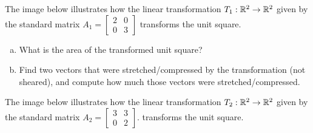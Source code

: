 
\begin{applicationActivities}{1}{25}

\begin{activity}{5}
The image below illustrates how the linear transformation
$T_1 : \mathbb{R}^2 \rightarrow \mathbb{R}^2$ given by the
standard matrix $A_1 = \begin{bmatrix} 2 & 0 \\ 0 & 3 \end{bmatrix}$
transforms the unit square.

\begin{center}
\end{center}

\begin{enumerate}[(a)]
\item What is the area of the transformed unit square?
\item Find two vectors that were stretched/compressed by the
      transformation (not sheared),
      and compute how much those vectors were stretched/compressed.
\end{enumerate}

\end{activity}


\begin{activity}{5}
The image below illustrates how the linear transformation
$T_2 : \mathbb{R}^2 \rightarrow \mathbb{R}^2$ given by the
standard matrix $A_2 = \begin{bmatrix} 3 & 3 \\ 0 & 2 \end{bmatrix}$.
transforms the unit square.


\end{activity}
\end{applicationActivities}
